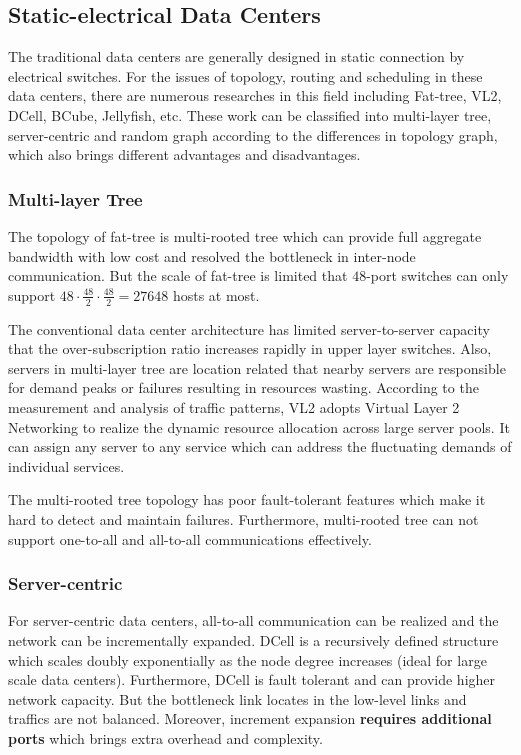 \documentclass[journal,onecolumn,11pt]{IEEEtran}
\begin{document}
\subsection{Static-electrical Data Centers}

The traditional data centers are generally designed in static connection by electrical switches. For the issues of topology, routing and scheduling in these data centers, there are numerous researches in this field including Fat-tree, VL2, DCell, BCube, Jellyfish, etc. These work can be classified into multi-layer tree, server-centric and random graph according to the differences in topology graph, which also brings different advantages and disadvantages.

\subsubsection{Multi-layer Tree}

The topology of fat-tree is multi-rooted tree which can provide full aggregate bandwidth with low cost and resolved the bottleneck in inter-node communication. But the scale of fat-tree is limited that $48$-port switches can only support $48 \cdot \frac{48}{2} \cdot \frac{48}{2}=27648$ hosts at most.

The conventional data center architecture has limited server-to-server capacity that the over-subscription ratio increases rapidly in upper layer switches. Also, servers in multi-layer tree are location related that nearby servers are responsible for demand peaks or failures resulting in resources wasting. According to the measurement and analysis of traffic patterns, VL2 adopts Virtual Layer 2 Networking to realize the dynamic resource allocation across large server pools. It can assign any server to any service which can address the fluctuating demands of individual services.

The multi-rooted tree topology has poor fault-tolerant features which make it hard to detect and maintain failures. Furthermore, multi-rooted tree can not support one-to-all and all-to-all communications effectively.


\subsubsection{Server-centric}

For server-centric data centers, all-to-all communication can be realized and the network can be incrementally expanded. DCell is a recursively defined structure which scales doubly exponentially as the node degree increases (ideal for large scale data centers). Furthermore, DCell is fault tolerant and can provide higher network capacity. But the bottleneck link locates in the low-level links and traffics are not balanced. Moreover, increment expansion \textbf{requires additional ports} which brings extra overhead and complexity.
\end{document}
